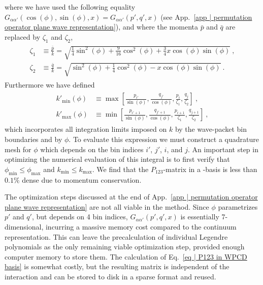 \documentclass[aps,prc,showpacs,twocolumn,floatfix,nobibnotes,nofootinbib,amsmath,amssymb,longbibliography]{revtex4-2}
\begin{document}
where we have used the following equality
$G_{\alpha\alpha'}(\cos(\phi),\sin(\phi),x) =
G_{\alpha\alpha'}(p',q',x)$ (see App.~\ref{app | permutation operator
  plane wave representation}), and where the momenta $\bar{p}$ and
$\bar{q}$ are replaced by $\zeta_1$ and $\zeta_2$,
\begin{align}
\begin{split}
\zeta_1 &\equiv \frac{\bar{p}}{k} = \sqrt{\frac{1}{4}\sin^2(\phi) + \frac{9}{16}\cos^2(\phi) + \frac{3}{4}x\cos(\phi)\sin(\phi)} \:, \\
\zeta_2 &\equiv \frac{\bar{q}}{k} = \sqrt{\sin^2(\phi) + \frac{1}{4}\cos^2(\phi) - x\cos(\phi)\sin(\phi)} \:.
\end{split}
\end{align}
Furthermore we have defined
\begin{align}
\begin{split}
k'_{\textrm{min}}(\phi) &\equiv \max\left[\frac{p_{i'}}{\sin(\phi)}, \frac{q_{j'}}{\cos(\phi)}, \frac{p_i}{\zeta_1}, \frac{q_j}{\zeta_2}\right] \:, \\
k'_{\textrm{max}}(\phi) &\equiv \min\left[\frac{p_{i'+1}}{\sin(\phi)}, \frac{q_{j'+1}}{\cos(\phi)}, \frac{p_{i+1}}{\zeta_1}, \frac{q_{j+1}}{\zeta_2}\right] \:,
\end{split}
\end{align}
which incorporates all integration limits imposed on $k$ by the
wave-packet bin boundaries and by $\phi$. To evaluate this expression
we must construct a quadrature mesh for $\phi$ which depends on the
bin indices $i'$, $j'$, $i$, and $j$. An important step in optimizing
the numerical evaluation of this integral is to first verify that
$\phi_{\text{min}}\leq\phi_{\text{max}}$ and $k_{\textrm{min}}\leq
k_{\textrm{max}}$. We find that the
$P_{123}$-matrix in a \fwp{}-basis is less than $0.1\%$ dense due to
momentum conservation.

The optimization steps discussed at the end of App.~\ref{app |
  permutation operator plane wave representation} are not all viable
in the \wpcd{} method. Since $\phi$ parametrizes $p'$ and $q'$, but
depends on 4 bin indices, $G_{\alpha\alpha'}(p',q',x)$ is essentially
7-dimensional, incurring a massive memory cost compared to the
continuum representation.  This can leave the precalculation of
individual Legendre polynomials as the only remaining viable
optimization step, provided enough computer memory to store them.  The
calculation of Eq.~\eqref{eq | P123 in WPCD basis} is somewhat costly,
but the resulting matrix is independent of the interaction and can be
stored to disk in a sparse format and reused.
\end{document}
